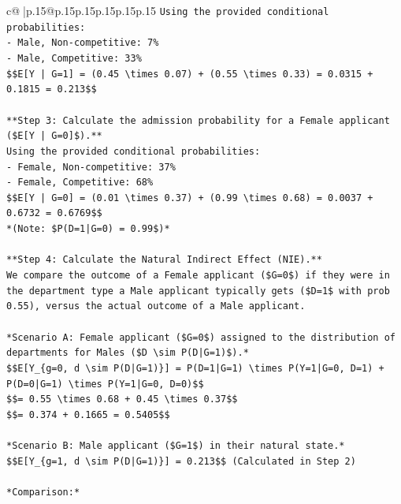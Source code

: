 \documentclass{article}
\begin{document}
{\begin{supertabular}{c@{$\;$}|p{.15\linewidth}@{}p{.15\linewidth}p{.15\linewidth}p{.15\linewidth}p{.15\linewidth}p{.15\linewidth}}
{{{\texttt{Using the provided conditional probabilities:} \\
\texttt{{-} Male, Non{-}competitive: 7\%} \\
\texttt{{-} Male, Competitive: 33\%} \\
\texttt{\$\$E{[}Y | G=1{]} = (0.45 \textbackslash{}times 0.07) + (0.55 \textbackslash{}times 0.33) = 0.0315 + 0.1815 = 0.213\$\$} \\
\\ 
\texttt{**Step 3: Calculate the admission probability for a Female applicant (\$E{[}Y | G=0{]}\$).**} \\
\texttt{Using the provided conditional probabilities:} \\
\texttt{{-} Female, Non{-}competitive: 37\%} \\
\texttt{{-} Female, Competitive: 68\%} \\
\texttt{\$\$E{[}Y | G=0{]} = (0.01 \textbackslash{}times 0.37) + (0.99 \textbackslash{}times 0.68) = 0.0037 + 0.6732 = 0.6769\$\$} \\
\texttt{*(Note: \$P(D=1|G=0) = 0.99\$)*} \\
\\ 
\texttt{**Step 4: Calculate the Natural Indirect Effect (NIE).**} \\
\texttt{We compare the outcome of a Female applicant (\$G=0\$) if they were in the department type a Male applicant typically gets (\$D=1\$ with prob 0.55), versus the actual outcome of a Male applicant.} \\
\\ 
\texttt{*Scenario A: Female applicant (\$G=0\$) assigned to the distribution of departments for Males (\$D \textbackslash{}sim P(D|G=1)\$).*} \\
\texttt{\$\$E{[}Y\_\{g=0, d \textbackslash{}sim P(D|G=1)\}{]} = P(D=1|G=1) \textbackslash{}times P(Y=1|G=0, D=1) + P(D=0|G=1) \textbackslash{}times P(Y=1|G=0, D=0)\$\$} \\
\texttt{\$\$= 0.55 \textbackslash{}times 0.68 + 0.45 \textbackslash{}times 0.37\$\$} \\
\texttt{\$\$= 0.374 + 0.1665 = 0.5405\$\$} \\
\\ 
\texttt{*Scenario B: Male applicant (\$G=1\$) in their natural state.*} \\
\texttt{\$\$E{[}Y\_\{g=1, d \textbackslash{}sim P(D|G=1)\}{]} = 0.213\$\$ (Calculated in Step 2)} \\
\\ 
\texttt{*Comparison:*} \\
}}}
\end{supertabular}}
\end{document}

